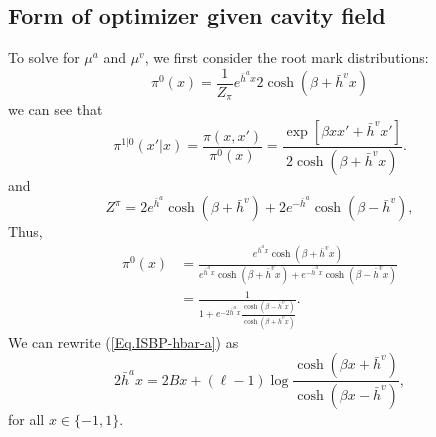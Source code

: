 \documentclass[12pt]{article}
\numberwithin{equation}{section}
\begin{document}
\newpage

\subsection{Form of optimizer given cavity field}

To solve for $\mu^a$ and $\mu^v$, we first consider the root mark distributions:
\begin{equation*}
    \pi^0(x) = \frac1{Z_\pi}e^{\bar{h}^a x} 2\cosh(\beta + \bar{h}^vx)
\end{equation*}
we can see that
\begin{equation*}
    \pi^{1|0}(x'|x) =\frac{\pi(x, x')}{\pi^0(x)}= \frac{\exp[\beta xx' + \bar{h}^vx']}{2\cosh(\beta + \bar{h}^vx)}.
\end{equation*}
and
\begin{equation*}
    Z^\pi = 2e^{\bar{h}^a}\cosh(\beta + \bar{h}^v) + 2e^{-\bar{h}^a}\cosh(\beta - \bar{h}^v),
\end{equation*}
Thus,
\begin{align*}
    \pi^0(x) & = \frac{e^{\bar{h}^a x} \cosh(\beta + \bar{h}^vx)}{e^{\bar{h}^a x}\cosh(\beta + \bar{h}^vx) + e^{-\bar{h}^ax}\cosh(\beta - \bar{h}^vx)} \\
             & = \frac{1}{1 + e^{-2\bar{h}^ax}\frac{\cosh(\beta - \bar{h}^vx)}{\cosh(\beta + \bar{h}^vx)}}.
\end{align*}
We can rewrite (\ref{Eq.ISBP-hbar-a}) as
\begin{equation*}
    2\bar{h}^a x = 2 B x + (\ell - 1) \log \frac{\cosh(\beta x + \bar{h}^v)}{\cosh(\beta x - \bar{h}^v)},
\end{equation*}
for all $x\in\{-1, 1\}$.
\end{document}
